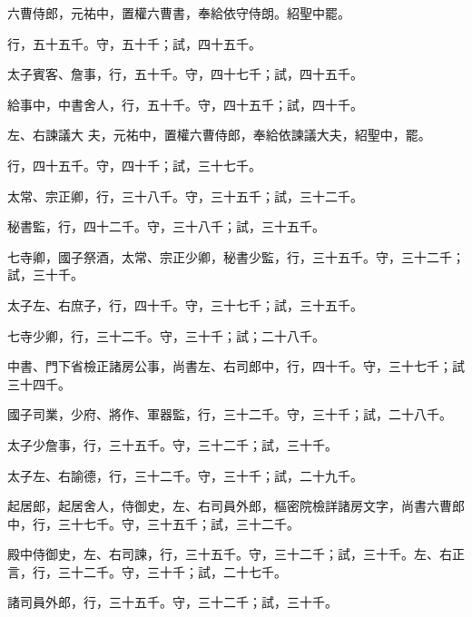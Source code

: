 \begin{pinyinscope}
 六曹侍郎，元祐中，置權六曹書，奉給依守侍朗。紹聖中罷。



 行，五十五千。守，五十千；試，四十五千。



 太子賓客、詹事，行，五十千。守，四十七千；試，四十五千。



 給事中，中書舍人，行，五十千。守，四十五千；試，四十千。



 左、右諫議大
 夫，元祐中，置權六曹侍郎，奉給依諫議大夫，紹聖中，罷。



 行，四十五千。守，四十千；試，三十七千。



 太常、宗正卿，行，三十八千。守，三十五千；試，三十二千。



 秘書監，行，四十二千。守，三十八千；試，三十五千。



 七寺卿，國子祭酒，太常、宗正少卿，秘書少監，行，三十五千。守，三十二千；試，三十千。



 太子左、右庶子，行，四十千。守，三十七千；試，三十五千。



 七寺少卿，行，三十二千。守，三十千；試；二十八千。



 中書、門下省檢正諸房公事，尚書左、右司郎中，行，四十千。守，三十七千；試三十四千。



 國子司業，少府、將作、軍器監，行，三十二千。守，三十千；試，二十八千。



 太子少詹事，行，三十五千。守，三十二千；試，三十千。



 太子左、右諭德，行，三十二千。守，三十千；試，二十九千。



 起居郎，起居舍人，侍御史，左、右司員外郎，樞密院檢詳諸房文字，尚書六曹郎中，行，三十七千。守，三十五千；試，三十二千。



 殿中侍御史，左、右司諫，行，三十五千。守，三十二千；試，三十千。左、右正言，行，三十二千。守，三十千；試，二十七千。



 諸司員外郎，行，三十五千。守，三十二千；試，三十千。




\end{pinyinscope}
